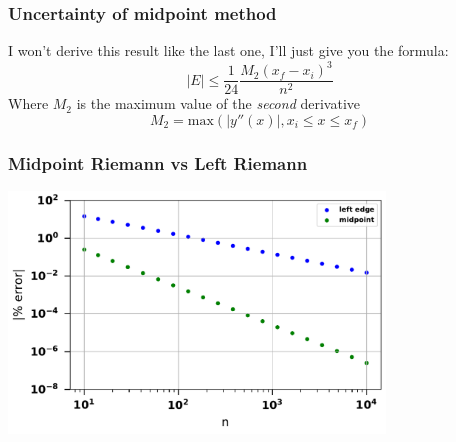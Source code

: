 \documentclass{beamer}
\begin{document}
\begin{frame}
	\frametitle{Uncertainty of midpoint method}
	I won't derive this result like the last one, I'll just give you the formula:
	\begin{equation*}
		|E|\leq\frac{1}{24}\frac{M_2(x_f-x_i)^3}{n^2}
	\end{equation*}
	Where $M_2$ is the maximum value of the \textit{second} derivative
\begin{equation*}
	M_2 = \mathrm{max}\left(|y''(x)|, x_i\leq x\leq x_f\right)
\end{equation*}
\end{frame}
\begin{frame}
	\frametitle{Midpoint Riemann vs Left Riemann}
	\begin{center}
		\includegraphics[width=10cm]{left_vs_mid.pdf}
	\end{center}
\end{frame}
\end{document}

